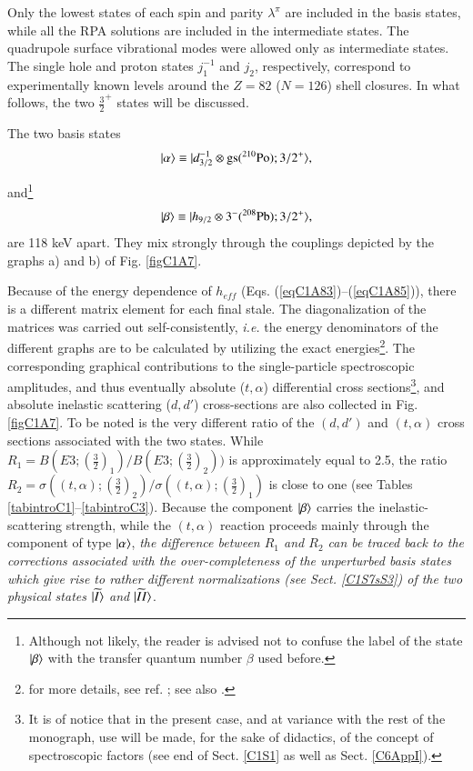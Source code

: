 Only the lowest states of each spin and parity $\lambda^{\pi}$ are included in the basis states, while all the RPA solutions are included in the intermediate states. The quadrupole surface vibrational modes were allowed only as intermediate states. The single hole and proton states $j_1^{-1}$ and $j_2$, respectively, correspond to experimentally known levels around the $Z = 82$ ($N=126$) shell closures.  
In what follows, the  two $\frac{3}{2}^+$ states will be discussed.

The two basis states 
  \begin{align}\label{eqC1A89} 
   |{\alpha} \rangle\equiv |{d_{3/2}^{-1}\otimes \text{gs}(^{210}\text{Po});3/2^+} \rangle,
    \end{align} 


and\footnote{Although not likely, the reader is advised not to confuse the label of the state $|{\beta} \rangle$ with the transfer quantum number $\beta$ used before.}
  \begin{align}\label{eqC1A90} 
      |{\beta} \rangle\equiv |{h_{9/2}\otimes 3^-(^{208}\text{Pb});3/2^+} \rangle,
    \end{align} 
are 118 keV apart. They mix strongly through the couplings depicted by the graphs a) and b) of Fig. \ref{figC1A7}. 


Because of the energy dependence of $h_{eff}$ (Eqs. (\ref{eqC1A83})--(\ref{eqC1A85})), there is a different matrix element 
for each final stale. The diagonalization of the matrices was carried out self-consistently, \textit{i.e.} the energy denominators of the different graphs are to be calculated by utilizing the exact energies\footnote{for more details, see ref. \cite{Bortignon:77}; see also \cite{Bortignon:76}.}. 
The corresponding graphical contributions to the single-particle spectroscopic amplitudes, and thus eventually absolute ($t,\alpha$) differential cross sections\footnote{It is of notice that in the present case, and at variance with the rest of the monograph, use will be made, for the sake of  didactics, of the concept of spectroscopic factors (see end of Sect. \ref{C1S1} as well as Sect. \ref{C6AppI}).}, and absolute inelastic scattering ($d,d'$) cross-sections are also collected in Fig. \ref{figC1A7}. To be noted is the very different ratio of the $(d,d')$ and $(t,\alpha)$ cross sections associated with the two states. While $R_1=B(E3;(\frac{3}{2})_1)/B(E3;(\frac{3}{2})_2))$ is approximately equal to 2.5, the ratio $R_2=\sigma((t,\alpha);(\frac{3}{2})_2)/\sigma((t,\alpha);(\frac{3}{2})_1)$ is close to one (see Tables \ref{tabintroC1}--\ref{tabintroC3}). Because the component $|{\beta} \rangle$ carries the inelastic-scattering strength, while the $(t,\alpha)$ reaction proceeds mainly through the component of type $|{\alpha} \rangle$, \textit{the difference between $R_1$ and $R_2$ can be traced back to the corrections associated with the over-completeness of the unperturbed basis states which give rise to rather different normalizations (see Sect. \ref{C1S7sS3}) of the two physical states $|{\widetilde I} \rangle$ and $|{\widetilde {II}} \rangle$}. 


